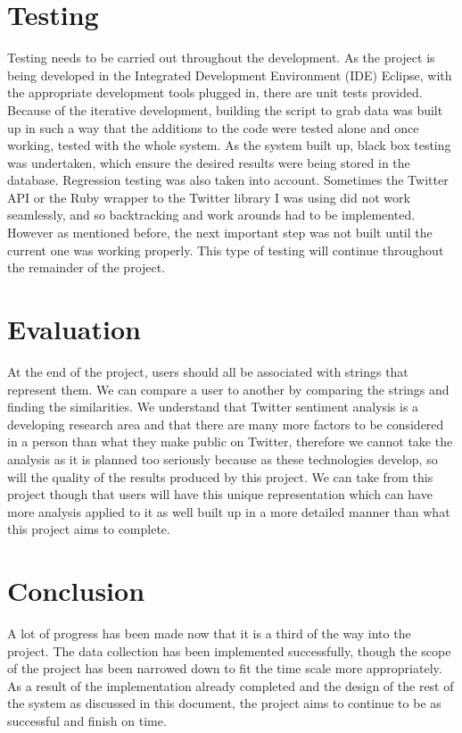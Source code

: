 \documentclass[a4paper]{article}
\begin{document}
\section{Testing}
Testing needs to be carried out throughout the development. As the project is being developed in the Integrated Development Environment (IDE) Eclipse, with the appropriate development tools plugged in, there are unit tests provided. Because of the iterative development, building the script to grab data was built up in such a way that the additions to the code were tested alone and once working, tested with the whole system. As the system built up, black box testing was undertaken, which ensure the desired results were being stored in the database. Regression testing was also taken into account. Sometimes the Twitter API or the Ruby wrapper to the Twitter library I was using did not work seamlessly, and so backtracking and work arounds had to be implemented. However as mentioned before, the next important step was not built until the current one was working properly. This type of testing will continue throughout the remainder of the project.

\section{Evaluation}
At the end of the project, users should all be associated with strings that represent them. We can compare a user to another by comparing the strings and finding the similarities. We understand that Twitter sentiment analysis is a developing research area and that there are many more factors to be considered in a person than what they make public on Twitter, therefore we cannot take the analysis as it is planned too seriously because as these technologies develop, so will the quality of the results produced by this project. We can take from this project though that users will have this unique representation which can have more analysis applied to it as well built up in a more detailed manner than what this project aims to complete. 

\section{Conclusion}
A lot of progress has been made now that it is a third of the way into the project. The data collection has been implemented successfully, though the scope of the project has been narrowed down to fit the time scale more appropriately. As a result of the implementation already completed and the design of the rest of the system as discussed in this document, the project aims to continue to be as successful and finish on time.



\end{document}
